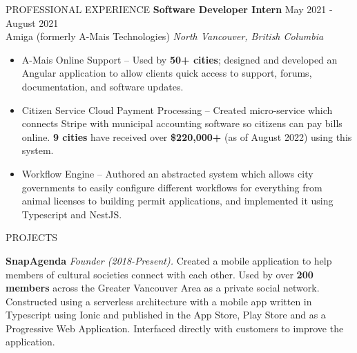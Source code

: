 \begin{rSection}{PROFESSIONAL EXPERIENCE}
\textbf{Software Developer Intern} \hfill May 2021 - August 2021\\
Amiga (formerly A-Mais Technologies) \hfill \textit{North Vancouver, British Columbia}
 \begin{itemize}
    \itemsep -6pt {} 
        \item A-Mais Online Support – Used by \textbf{50+ cities}; designed and developed an Angular application to allow clients quick access to support, forums, documentation, and software updates.
        \item Citizen Service Cloud Payment Processing – Created micro-service which connects Stripe with municipal accounting software so citizens can pay bills online. \textbf{9 cities} have received over \textbf{\$220,000+} (as of August 2022) using this system.
        \item Workflow Engine – Authored an abstracted system which allows city governments to easily configure different workflows for everything from animal licenses to building permit applications, and implemented it using Typescript and NestJS.
 \end{itemize}

\end{rSection} 


\begin{rSection}{PROJECTS}
\vspace{-1.25em}
\item \textbf{SnapAgenda} \textit{Founder (2018-Present). } {Created a mobile application to help members of cultural societies connect with each other. Used by over \textbf{200 members} across the Greater Vancouver Area as a private social network. Constructed using a serverless architecture with a mobile app written in Typescript using Ionic and published in the App Store, Play Store and as a Progressive Web Application. Interfaced directly with customers to improve the application.}

\end{rSection} 

